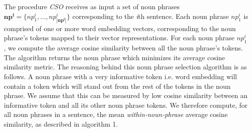The procedure \textit{CSO} receives as input a set of noun phrases
$ \mathbf{np^i} = \{np^i_1, ..., np^i_{ | \mathbf{np^i}|} \}$ corresponding to the \textit{i}th sentence. Each noun phrase $np^i_1$
is comprised of one or more word embedding vectors, corresponding to the noun phrase's tokens mapped to their vector representations.
For each noun phrase $np^i_1$, we compute the average cosine similarity between all the noun phrase's tokens. The algorithm returns the noun phrase which
minimizes its average cosine similarity metric. The reasoning behind this noun phrase selection algorithm is as follows. A noun phrase with a very informative
token i.e. word embedding will contain a token which will stand out from the rest of the tokens in the noun phrase. We assume that this can be measured
by low cosine similarity between an informative token and all its other noun phrase tokens. We therefore compute, for all noun phrases in a sentence,
the mean \textit{within-noun-phrase} average cosine similarity, as described in algorithm 1.


